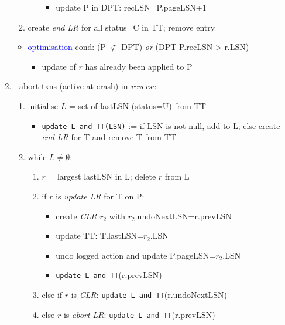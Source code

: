\documentclass[10pt, landscape]{article}
\begin{document}
\begin{multicols*}{4}
\begin{enumerate}
\begin{enumerate}
\begin{enumerate}
              \begin{itemize}
                \item update P in DPT: recLSN=P.pageLSN+1
              \end{itemize}
          \end{enumerate}
        \item create \textit{end LR} for all status=C in TT; remove entry
      \end{enumerate}
      \begin{itemize}
        \item \textcolor{blue}{optimisation} cond: (P $\not\in$ DPT) \textit{or} (DPT P.recLSN > r.LSN)
          \begin{itemize}
            \item update of $r$ has already been applied to P
          \end{itemize}
      \end{itemize}
    \item {} - abort  txns (active at crash) in \textit{reverse}
      \begin{enumerate}
        \item initialise $L$ = set of lastLSN (status=U) from TT
          \begin{itemize}
            \item \texttt{update-L-and-TT(LSN)} := if LSN is not null, add to L; else create \textit{end LR} for T and remove T from TT
          \end{itemize}
        \item while $L \neq \emptyset$:
          \begin{enumerate}
            \item $r$ = largest lastLSN in L; delete $r$ from L
            \item if $r$ is \textit{update LR} for T on P:
              \begin{itemize}
                \item create \textit{CLR} $r_2$ with $r_2$.undoNextLSN=r.prevLSN
                \item update TT: T.lastLSN=$r_2$.LSN
                \item undo logged action and update P.pageLSN=$r_2$.LSN
                \item \texttt{update-L-and-TT}(r.prevLSN)
              \end{itemize}
            \item else if $r$ is \textit{CLR}: \texttt{update-L-and-TT}(r.undoNextLSN)
            \item else $r$ is \textit{abort LR}: \texttt{update-L-and-TT}(r.prevLSN)
          \end{enumerate}
      \end{enumerate}
  \end{enumerate}


\end{multicols*}
\end{document}
